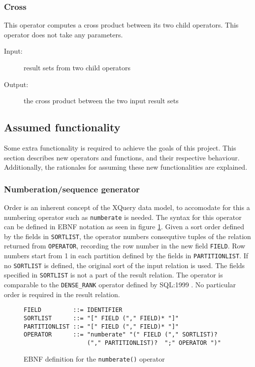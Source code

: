 \subsubsection{Cross}
This operator computes a cross product between its two child operators. This
operator does not take any parameters.

\begin{description}
  \item[Input:] result sets from two child operators
  \item[Output:] the cross product between the two input result sets
\end{description}

\subsection{Assumed functionality}
\label{sect:method:marsAddedOperators}
Some extra functionality is required to achieve the goals of this project. This
section describes new operators and functions, and their respective behaviour.
Additionally, the rationales for assuming these new functionalities are
explained.

\subsubsection{Numberation/sequence generator}
Order is an inherent concept of the XQuery data model, to accomodate for this a numbering operator such as
\texttt{numberate} is needed. The syntax for this operator can be defined in EBNF notation as seen in figure
\ref{figure:mql:numberate_ebnf}. Given a sort order defined by the fields in \texttt{SORTLIST}, the operator
numbers consequtive tuples of the relation returned from \texttt{OPERATOR}, recording the row number in the new
field \texttt{FIELD}. Row numbers start from 1 in each partition defined by the fields in \texttt{PARTITIONLIST}.
If no \texttt{SORTLIST} is defined, the original sort of the input relation is used. The fields specified in
\texttt{SORTLIST} is not a part of the result relation. The operator is comparable to the \texttt{DENSE\_RANK}
operator defined by SQL:1999 \cite{sqlbook}. No particular order is required in the result relation.

\begin{figure}[!h]
\begin{center}
\begin{Verbatim}
FIELD         ::= IDENTIFIER
SORTLIST      ::= "[" FIELD ("," FIELD)* "]"
PARTITIONLIST ::= "[" FIELD ("," FIELD)* "]"
OPERATOR      ::= "numberate" "(" FIELD ("," SORTLIST)? 
                  ("," PARTITIONLIST)?  ";" OPERATOR ")"
\end{Verbatim}
  \caption{EBNF definition for the \texttt{numberate()} operator}
  \label{figure:mql:numberate_ebnf}
\end{center}
\end{figure}

